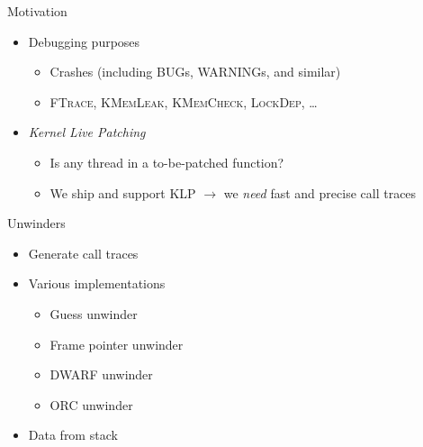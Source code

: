 \begin{frame}{Motivation}


  \begin{itemize}
    \item Debugging purposes
    \begin{itemize}
      \item Crashes (including BUGs, WARNINGs, and similar)

      \pause

      \item \textsc{FTrace}, \textsc{KMemLeak}, \textsc{KMemCheck},
	\textsc{LockDep}, \dots
    \end{itemize}

    \pause

    \item \emph{Kernel Live Patching}
    \begin{itemize}
      \item Is any thread in a to-be-patched function?

      \pause

      \item We ship and support KLP $\rightarrow$ we \emph{need} fast and
	precise call traces
    \end{itemize}

  \end{itemize}

\end{frame}

\begin{frame}{Unwinders}

  \begin{itemize}[<+->]
    \item Generate call traces
    \item Various implementations
    \begin{itemize}[<.->]
      \item Guess unwinder
      \item Frame pointer unwinder
      \item DWARF unwinder
      \item ORC unwinder
    \end{itemize}

    \item Data from stack
  \end{itemize}

\end{frame}

